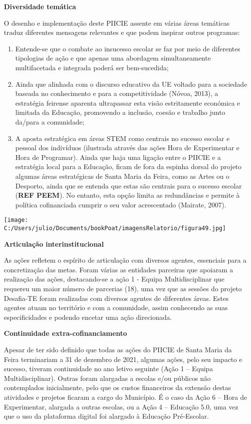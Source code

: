 \documentclass[
]{book}
\begin{document}
\textbf{Diversidade temática}

O desenho e implementação deste PIICIE assente em várias áreas temáticas traduz diferentes mensagens relevantes e que podem inspirar outros programas:

\begin{enumerate}
\def\labelenumi{\arabic{enumi}.}
\item
  Entende-se que o combate ao insucesso escolar se faz por meio de diferentes tipologias de ação e que apenas uma abordagem simultaneamente multifacetada e integrada poderá ser bem-sucedida;
\item
  Ainda que alinhada com o discurso educativo da UE voltado para a sociedade baseada no conhecimento e para a competitividade (Nóvoa, 2013), a estratégia feirense aparenta ultrapassar esta visão estritamente económica e limitada da Educação, promovendo a inclusão, coesão e trabalho junto da/para a comunidade;
\item
  A aposta estratégica em áreas STEM como centrais no sucesso escolar e pessoal dos indivíduos (ilustrada através das ações Hora de Experimentar e Hora de Programar).
  Ainda que haja uma ligação entre o PIICIE e a estratégia local para a Educação, ficam de fora da espinha dorsal do projeto algumas áreas estratégicas de Santa Maria da Feira, como as Artes ou o Desporto, ainda que se entenda que estas são centrais para o sucesso escolar (\textbf{REF PEEM}). No entanto, esta opção limita as redundâncias e permite à política cofinanciada cumprir o seu valor acrescentado (Mairate, 2007).
\end{enumerate}

\texttt{[image: C:/Users/julio/Documents/bookPoat/imagensRelatorio/figura49.jpg]}

\textbf{Articulação interinstitucional}

As ações refletem o espírito de articulação com diversos agentes, essenciais para a concretização das metas. Foram várias as entidades parceiras que apoiaram a realização das ações, destacando-se a ação 1 - Equipa Multidisciplinar que requereu um maior número de parcerias (18), uma vez que as sessões do projeto Desafia-TE foram realizadas com diversos agentes de diferentes áreas. Estes agentes atuam no território e com a comunidade, assim conhecendo as suas especificidades e podendo encetar uma ação direcionada.

\textbf{Continuidade extra-cofinanciamento}

Apesar de ter sido definido que todas as ações do PIICIE de Santa Maria da Feira terminariam a 31 de dezembro de 2021, algumas ações, pelo seu impacto e sucesso, tiveram continuidade no ano letivo seguinte (Ação 1 -- Equipa Multidisciplinar). Outras foram alargadas a escolas e/ou públicos não contemplados inicialmente, pelo que os custos financeiros da extensão destas atividades e projetos ficaram a cargo do Município. É o caso da Ação 6 -- Hora de Experimentar, alargada a outras escolas, ou a Ação 4 -- Educação 5.0, uma vez que o uso da plataforma digital foi alargado à Educação Pré-Escolar.
\end{document}
